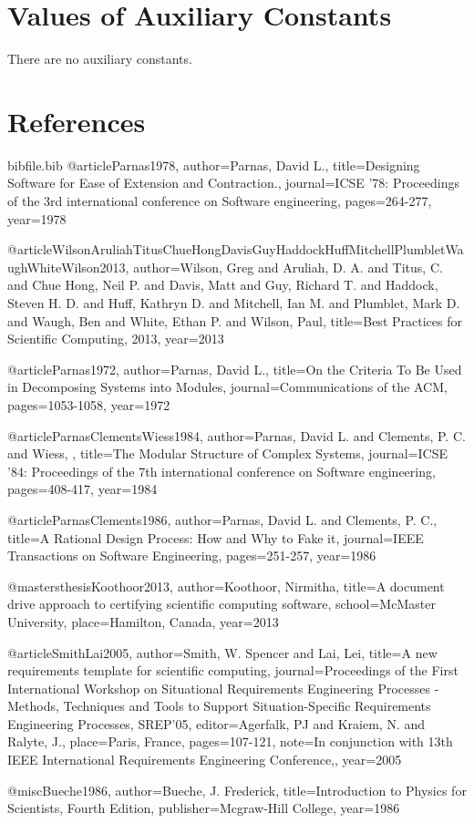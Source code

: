 \documentclass[12pt]{article}
\begin{document}
\section{Values of Auxiliary Constants}
\label{Sec:ValuofAuxiCons}
There are no auxiliary constants.
\section{References}
\label{Sec:Refe}
\begin{filecontents*}{bibfile.bib}
@article{Parnas1978,
author={Parnas, David L.},
title={Designing Software for Ease of Extension and Contraction.},
journal={ICSE '78: Proceedings of the 3rd international conference on Software engineering},
pages={264-277},
year={1978}}

@article{WilsonAruliahTitusChueHongDavisGuyHaddockHuffMitchellPlumbletWaughWhiteWilson2013,
author={Wilson, Greg and Aruliah, D. A. and Titus, C. and Chue Hong, Neil P. and Davis, Matt and Guy, Richard T. and Haddock, Steven H. D. and Huff, Kathryn D. and Mitchell, Ian M. and Plumblet, Mark D. and Waugh, Ben and White, Ethan P. and Wilson, Paul},
title={Best Practices for Scientific Computing, 2013},
year={2013}}

@article{Parnas1972,
author={Parnas, David L.},
title={On the Criteria To Be Used in Decomposing Systems into Modules},
journal={Communications of the ACM},
pages={1053-1058},
year={1972}}

@article{ParnasClementsWiess1984,
author={Parnas, David L. and Clements, P. C. and Wiess, },
title={The Modular Structure of Complex Systems},
journal={ICSE '84: Proceedings of the 7th international conference on Software engineering},
pages={408-417},
year={1984}}

@article{ParnasClements1986,
author={Parnas, David L. and Clements, P. C.},
title={A Rational Design Process: How and Why to Fake it},
journal={IEEE Transactions on Software Engineering},
pages={251-257},
year={1986}}

@mastersthesis{Koothoor2013,
author={Koothoor, Nirmitha},
title={A document drive approach to certifying scientific computing software},
school={McMaster University},
place={Hamilton, Canada},
year={2013}}

@article{SmithLai2005,
author={Smith, W. Spencer and Lai, Lei},
title={A new requirements template for scientific computing},
journal={Proceedings of the First International Workshop on Situational Requirements Engineering Processes - Methods, Techniques and Tools to Support Situation-Specific Requirements Engineering Processes, SREP'05},
editor={Agerfalk, PJ and Kraiem, N. and Ralyte, J.},
place={Paris, France},
pages={107-121},
note={In conjunction with 13th IEEE International Requirements Engineering Conference,},
year={2005}}

@misc{Bueche1986,
author={Bueche, J. Frederick},
title={Introduction to Physics for Scientists, Fourth Edition},
publisher={Mcgraw-Hill College},
year={1986}}
\end{filecontents*}
\nocite{*}
\printbibliography[heading=none]
\end{document}
